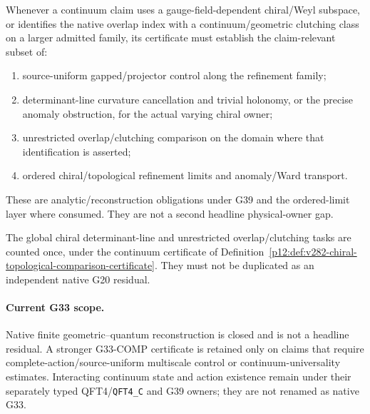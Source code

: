 \documentclass[12pt,a4paper]{article}
\begin{document}
\begin{definition}
\label{p12:def:v282-chiral-topological-comparison-certificate}
Whenever a continuum claim uses a gauge-field-dependent chiral/Weyl subspace,
or identifies the native overlap index with a continuum/geometric clutching
class on a larger admitted family, its certificate must establish the
claim-relevant subset of:
\begin{enumerate}
\item source-uniform gapped/projector control along the refinement family;
\item determinant-line curvature cancellation and trivial holonomy, or the
      precise anomaly obstruction, for the actual varying chiral owner;
\item unrestricted overlap/clutching comparison on the domain where that
      identification is asserted;
\item ordered chiral/topological refinement limits and anomaly/Ward transport.
\end{enumerate}
These are analytic/reconstruction obligations under G39 and the ordered-limit
layer where consumed.  They are not a second headline physical-owner gap.
\end{definition}

\begin{corollary}
\label{p12:cor:v282-no-g20-duplication}
The global chiral determinant-line and unrestricted overlap/clutching tasks
are counted once, under the continuum certificate of
Definition~\ref{p12:def:v282-chiral-topological-comparison-certificate}.
They must not be duplicated as an independent native G20 residual.
\end{corollary}

\paragraph{Current G33 scope.}
Native finite geometric--quantum reconstruction is closed and is not a
headline residual.  A stronger \(\mathrm{G33\text{-}COMP}\) certificate is
retained only on claims that require complete-action/source-uniform multiscale
control or continuum-universality estimates.  Interacting continuum state and
action existence remain under their separately typed QFT4/\texttt{QFT4\_C} and G39
owners; they are not renamed as native G33.
\end{document}
